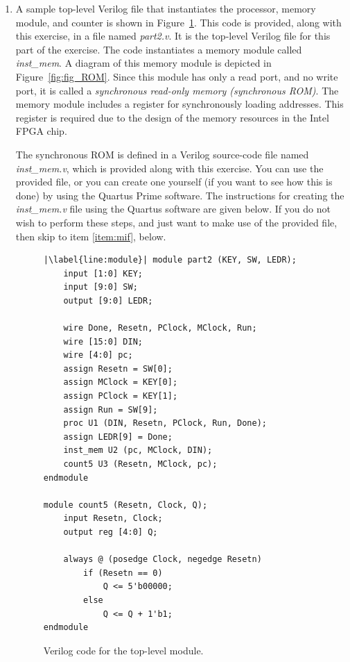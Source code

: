 \documentclass[epsfig,10pt,fullpage]{article} \addtolength{\textwidth}{1.5in}
\begin{document}
\begin{enumerate}
\item A sample top-level Verilog file that instantiates the processor, memory module, and
counter is shown in Figure~\ref{fig:procmem}. This code is provided, along with this exercise,
in a file named {\it part2.v}. It is the top-level Verilog file for this part of the exercise. 
The code instantiates a memory module called {\it inst\_mem}. 
A diagram of this memory module is depicted in Figure~\ref{fig:fig_ROM}.
Since this module has only a read port, and no write port, it is called a {\it synchronous 
read-only memory (synchronous ROM)}. The memory module includes a register for 
synchronously loading addresses. This register is required due to the design of the memory 
resources in the Intel FPGA chip. 

The synchronous ROM is defined in a Verilog source-code file named 
{\it inst\_mem.v}, which is provided
along with this exercise. You can use the provided file, or you can create one yourself 
(if you want to see how this is done) by using the Quartus Prime software. The instructions for 
creating the {\it inst\_mem.v} file using the Quartus software are given below. If you do 
not wish to perform these steps, and just want to make use of the provided file, then 
skip to item \ref{item:mif}, below.
                
\lstset{language=Verilog,numbers=none,escapechar=|}
\begin{figure}[h]
\begin{center}
\begin{minipage}[t]{12.5 cm}
\begin{lstlisting}[name=proc]
|\label{line:module}| module part2 (KEY, SW, LEDR);
    input [1:0] KEY;
    input [9:0] SW;
    output [9:0] LEDR;	

    wire Done, Resetn, PClock, MClock, Run;
    wire [15:0] DIN;
    wire [4:0] pc;
    assign Resetn = SW[0];
    assign MClock = KEY[0];
    assign PClock = KEY[1];
    assign Run = SW[9];
    proc U1 (DIN, Resetn, PClock, Run, Done);
    assign LEDR[9] = Done;
    inst_mem U2 (pc, MClock, DIN);
    count5 U3 (Resetn, MClock, pc);
endmodule

module count5 (Resetn, Clock, Q);
    input Resetn, Clock;
    output reg [4:0] Q;

    always @ (posedge Clock, negedge Resetn)
        if (Resetn == 0)
            Q <= 5'b00000;
        else
            Q <= Q + 1'b1;
endmodule
\end{lstlisting}
\end{minipage}
\caption{Verilog code for the top-level module.}
\label{fig:procmem}
\end{center}
\end{figure}


\end{enumerate}
\end{document}
